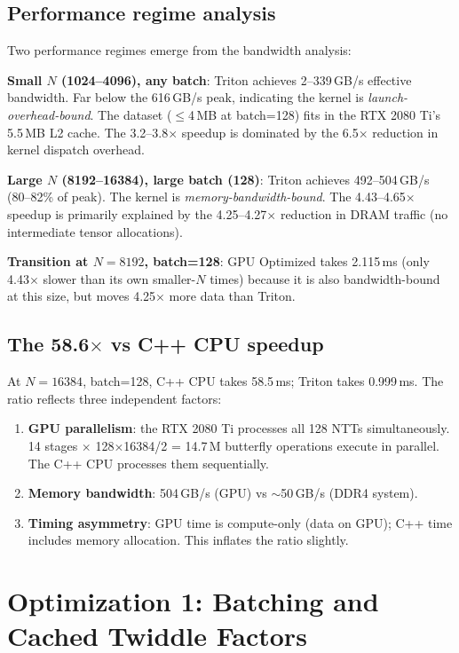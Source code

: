\documentclass[11pt,a4paper]{article}
\begin{document}
\clearpage

\subsection{Performance regime analysis}
\label{sec:bottleneck}

Two performance regimes emerge from the bandwidth analysis:

\textbf{Small $N$ (1024--4096), any batch}: Triton achieves 2--339\,GB/s effective
bandwidth. Far below the 616\,GB/s peak, indicating the kernel is
\emph{launch-overhead-bound}. The dataset ($\leq$4\,MB at batch=128) fits in the RTX
2080 Ti's 5.5\,MB L2 cache. The 3.2--3.8$\times$ speedup is dominated by the 6.5$\times$
reduction in kernel dispatch overhead.

\textbf{Large $N$ (8192--16384), large batch (128)}: Triton achieves 492--504\,GB/s
(80--82\% of peak). The kernel is \emph{memory-bandwidth-bound}. The 4.43--4.65$\times$
speedup is primarily explained by the 4.25--4.27$\times$ reduction in DRAM traffic (no
intermediate tensor allocations).

\textbf{Transition at $N=8192$, batch=128}: GPU Optimized takes 2.115\,ms (only 4.43$\times$
slower than its own smaller-$N$ times) because it is also bandwidth-bound at this size,
but moves 4.25$\times$ more data than Triton.

\subsection{The 58.6$\times$ vs C++ CPU speedup}

At $N=16384$, batch=128, C++ CPU takes 58.5\,ms; Triton takes 0.999\,ms.
The ratio reflects three independent factors:
\begin{enumerate}
  \item \textbf{GPU parallelism}: the RTX 2080 Ti processes all 128 NTTs simultaneously.
    14 stages $\times$ 128$\times$16384/2 = 14.7\,M butterfly operations execute in
    parallel. The C++ CPU processes them sequentially.
  \item \textbf{Memory bandwidth}: 504\,GB/s (GPU) vs $\sim$50\,GB/s (DDR4 system).
  \item \textbf{Timing asymmetry}: GPU time is compute-only (data on GPU);
    C++ time includes memory allocation. This inflates the ratio slightly.
\end{enumerate}

\section{Optimization 1: Batching and Cached Twiddle Factors}
\end{document}
